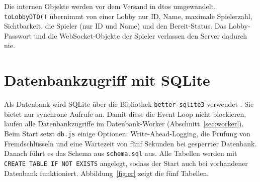 Die internen Objekte werden vor dem Versand in \glspl{dto} umgewandelt. \texttt{toLobbyDTO()} übernimmt von einer Lobby nur ID, Name, maximale Spielerzahl, Sichtbarkeit, die Spieler (nur ID und Name) und den Bereit-Status. Das Lobby-Passwort und die WebSocket-Objekte der Spieler verlassen den Server dadurch nie.

\section{Datenbankzugriff mit SQLite}
\label{sec:sqlite}

Als Datenbank wird SQLite über die Bibliothek \texttt{better-sqlite3} verwendet . Sie bietet nur synchrone Aufrufe an. Damit diese die Event Loop nicht blockieren, laufen alle Datenbankzugriffe im Datenbank-Worker (Abschnitt~\ref{sec:worker}). Beim Start setzt \texttt{db.js} einige Optionen: Write-Ahead-Logging, die Prüfung von Fremdschlüsseln und eine Wartezeit von fünf Sekunden bei gesperrter Datenbank. Danach führt es das Schema aus \texttt{schema.sql} aus. Alle Tabellen werden mit \texttt{CREATE TABLE IF NOT EXISTS} angelegt, sodass der Start auch bei vorhandener Datenbank funktioniert. Abbildung~\ref{fig:er} zeigt die fünf Tabellen.

